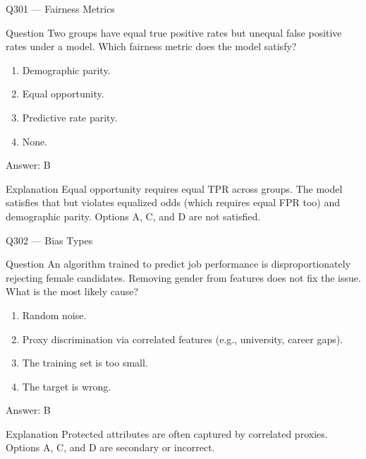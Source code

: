 \documentclass[aspectratio=169,8pt]{beamer}
\begin{document}
\begin{frame}{Q301 --- Fairness Metrics}
\begin{block}{Question}
Two groups have equal true positive rates but unequal false positive rates under a model. Which fairness metric does the model satisfy?
\begin{enumerate}
\item Demographic parity.
\item Equal opportunity.
\item Predictive rate parity.
\item None.
\end{enumerate} \end{block}
\begin{exampleblock}{Answer: B}\end{exampleblock}
\begin{block}{Explanation}
Equal opportunity requires equal TPR across groups. The model satisfies that but violates equalized odds (which requires equal FPR too) and demographic parity. Options A, C, and D are not satisfied.
\end{block}
\end{frame}

\begin{frame}{Q302 --- Bias Types}
\begin{block}{Question}
An algorithm trained to predict job performance is disproportionately rejecting female candidates. Removing gender from features does not fix the issue. What is the most likely cause?
\begin{enumerate}
\item Random noise.
\item Proxy discrimination via correlated features (e.g., university, career gaps).
\item The training set is too small.
\item The target is wrong.
\end{enumerate}\end{block}
\begin{exampleblock}{Answer: B}\end{exampleblock}
\begin{block}{Explanation}
Protected attributes are often captured by correlated proxies. Options A, C, and D are secondary or incorrect.
\end{block}
\end{frame}
\end{document}
